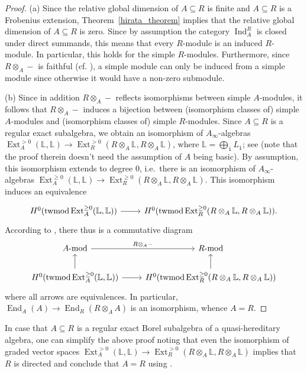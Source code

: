 \documentclass[12pt,a4paper]{amsart}
\theoremstyle{plain}
\theoremstyle{definition}
\numberwithin{equation}{thm}
\DeclareMathOperator{\Ext}{Ext}
\DeclareMathOperator{\End}{End}
\DeclareMathOperator{\Ind}{Ind}
\DeclareMathOperator{\twmod}{twmod}
\newcommand{\modu}[1]{#1\hbox{-}\mathrm{mod}}
\begin{document}
\begin{proof}
  (a) Since the relative global dimension of $A\subseteq R$ is finite and $A\subseteq R$ is a Frobenius extension, Theorem~\ref{hirata_theorem}  implies that the relative global dimension of $A\subseteq R$ is zero. Since by assumption the category $\Ind_A^R$ is closed under direct summands, this means that every $R$-module is an induced $R$-module. In particular, this holds for the simple $R$-modules. Furthermore, since $R\otimes_A -$ is faithful (cf. \cite[Proof of Theorem 4.16 using Lemma 3.1]{Con21b}), a simple module can only be induced from a simple module since otherwise it would have a non-zero submodule.

(b) Since in addition $R\otimes_A -$ reflects isomorphisms between simple $A$-modules, it follows that $R\otimes_A -$ induces a bijection between (isomorphism classes of) simple $A$-modules and (isomorphism classes of) simple $R$-modules. Since $A\subseteq R$ is a regular exact subalgebra, we obtain an isomorphism of $A_\infty$-algebras $\Ext^{>0}_A(\mathbb{L},\mathbb{L})\to \Ext^{>0}_R(R\otimes_A \mathbb{L},R\otimes_A \mathbb{L})$, where $\mathbb{L}=\bigoplus_{\mathtt{i}}L_\mathtt{i}$; see \cite[Theorem~3.21]{KM25} (note that the proof therein doesn't need the assumption of $A$ being basic). By assumption, this isomorphism extends to degree $0$, i.e.\ there is an isomorphism of $A_\infty$-algebras $\Ext^{\geq 0}_A(\mathbb{L},\mathbb{L})\to \Ext^{\geq 0}_R(R\otimes_A \mathbb{L},R\otimes_A \mathbb{L})$. This isomorphism induces an equivalence 
\[
\begin{tikzcd}
H^0(\twmod \Ext^{\geq 0}_A(\mathbb{L},\mathbb{L}))\arrow{r} &H^0(\twmod \Ext^{\geq 0}_R(R\otimes_A \mathbb{L}, R\otimes_A \mathbb{L})).
\end{tikzcd}
\] According to \cite[Corollary 5.17, cf. (3) on p.4]{RR25}, there thus is a commutative diagram
\[
\begin{tikzcd}
\modu{A}\arrow{r}{R\otimes_A -} &\modu{R}\\
H^0(\twmod\Ext^{\geq 0}_A(\mathbb{L},\mathbb{L}))\arrow{r}\arrow{u}&H^0(\twmod\Ext^{\geq 0}_R(R\otimes_A \mathbb{L}, R\otimes_A \mathbb{L}))\arrow{u}
\end{tikzcd}
\]
where all arrows are equivalences. In particular, $\End_A(A)\to \End_R(R\otimes_A A)$ is an isomorphism, whence $A=R$. 
\end{proof}

In case that $A\subseteq R$ is a regular exact Borel subalgebra of a quasi-hereditary algebra, one can simplify the above proof noting that even the isomorphism of graded vector spaces $\Ext^{>0}_A(\mathbb{L},\mathbb{L})\to \Ext^{>0}_R(R\otimes_A \mathbb{L}, R\otimes_A \mathbb{L})$ implies that $R$ is directed and conclude that $A=R$ using \cite[Lemma 3.7]{RR25}.
\end{document}
